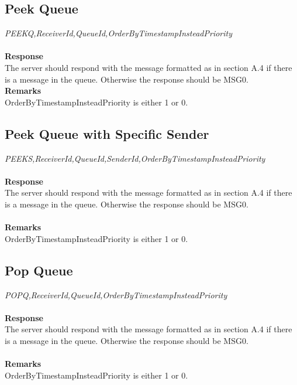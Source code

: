 \documentclass{article}
\begin{document}
            \subsection{Peek Queue}
                \indent\indent \textit{PEEKQ,ReceiverId,QueueId,OrderByTimestampInsteadPriority}\\
                \\
                \textbf{Response}\\
                The server should respond with the message formatted as in section A.4 if there is a message in the queue. Otherwise the response should be MSG0.\\
                \textbf{Remarks}\\
                OrderByTimestampInsteadPriority is either 1 or 0.

            \subsection{Peek Queue with Specific Sender}
                \indent\indent\textit{PEEKS,ReceiverId,QueueId,SenderId,OrderByTimestampInsteadPriority}\\
            \\
            \textbf{Response}\\
            The server should respond with the message formatted as in section A.4 if there is a message in the queue. Otherwise the response should be MSG0.\\
            \\
            \textbf{Remarks}\\
            OrderByTimestampInsteadPriority is either 1 or 0.


            \subsection{Pop Queue}
                \indent\indent\textit{POPQ,ReceiverId,QueueId,OrderByTimestampInsteadPriority}\\
                \\
                \textbf{Response}\\
                The server should respond with the message formatted as in section A.4 if there is a message in the queue. Otherwise the response should be MSG0.\\
                \\
                \textbf{Remarks}\\
                OrderByTimestampInsteadPriority is either 1 or 0.
\end{document}
